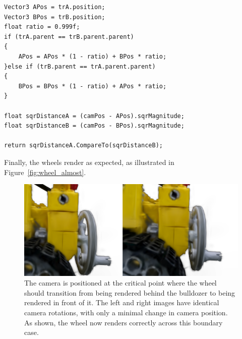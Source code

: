 \documentclass[12pt]{article}
\begin{document}
\begin{lstlisting}[tabsize=2,caption=The final implemention of the sort key, label=code:sort_ratio,breaklines=true,breakatwhitespace=true,basicstyle=\ttfamily\footnotesize]
Vector3 APos = trA.position;
Vector3 BPos = trB.position;
float ratio = 0.999f;
if (trA.parent == trB.parent.parent)
{
	APos = APos * (1 - ratio) + BPos * ratio;
}else if (trB.parent == trA.parent.parent)
{
	BPos = BPos * (1 - ratio) + APos * ratio;
}

float sqrDistanceA = (camPos - APos).sqrMagnitude;
float sqrDistanceB = (camPos - BPos).sqrMagnitude;

return sqrDistanceA.CompareTo(sqrDistanceB);
\end{lstlisting}
Finally, the wheels render as expected, as illustrated in Figure~\ref{fig:wheel_almost}.
\begin{figure}[h!]
	\centering
	\includegraphics[width=\textwidth]{Images/sort_done.png}
	\caption{The camera is positioned at the critical point where the wheel should transition from being rendered behind the bulldozer to being rendered in front of it. The left and right images have identical camera rotations, with only a minimal change in camera position. As shown, the wheel now renders correctly across this boundary case.}
	\label{fig:wheel_done}
\end{figure}
\FloatBarrier
\noindent
\end{document}
